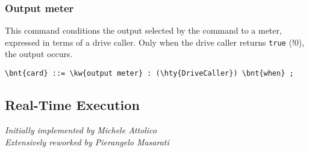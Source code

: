 \subsubsection{Output meter}
This command conditions the output selected by the  command
to a meter, expressed in terms of a drive caller.
Only when the drive caller returns \texttt{true} (!0), the output occurs.
\begin{Verbatim}[commandchars=\\\{\}]
    \bnt{card} ::= \kw{output meter} : (\hty{DriveCaller}) \bnt{when} ;
\end{Verbatim}



\subsection{Real-Time Execution}\label{sec:REAL-TIME}
\emph{Initially implemented by Michele Attolico} \\
\emph{Extensively reworked by Pierangelo Masarati}

